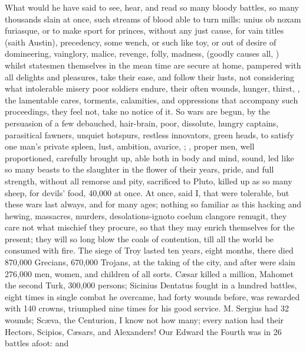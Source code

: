 {What would he have said to see, hear, and read so many bloody battles,
so many thousands slain at once, such streams of blood able to turn
mills: unius ob noxam furiasque, or to make sport for princes, without
any just cause, for vain titles (saith Austin), precedency, some
wench, or such like toy, or out of desire of domineering, vainglory,
malice, revenge, folly, madness, (goodly causes all, ) whilst statesmen themselves in the
mean time are secure at home, pampered with all delights and pleasures,
take their ease, and follow their lusts, not considering what
intolerable misery poor soldiers endure, their often wounds, hunger,
thirst, \etc{}, the lamentable cares, torments, calamities, and
oppressions that accompany such proceedings, they feel not, take no
notice of it. So wars are begun, by the persuasion of a few debauched,
hair-brain, poor, dissolute, hungry captains, parasitical fawners,
unquiet hotspurs, restless innovators, green heads, to satisfy one
man's private spleen, lust, ambition, avarice, \etc{}; , proper men, well
proportioned, carefully brought up, able both in body and mind, sound,
led like so many beasts to the slaughter in the flower of their
years, pride, and full strength, without all remorse and pity,
sacrificed to Pluto, killed up as so many sheep, for devils' food,
40,000 at once. At once, said I, that were tolerable, but these wars
last always, and for many ages; nothing so familiar as this hacking and
hewing, massacres, murders, desolations-ignoto coelum clangore remugit,
they care not what mischief they procure, so that they may enrich
themselves for the present; they will so long blow the coals of
contention, till all the world be consumed with fire. The siege of
Troy lasted ten years, eight months, there died 870,000 Grecians,
670,000 Trojans, at the taking of the city, and after were slain
276,000 men, women, and children of all sorts. C\ae{}sar killed a million,
Mahomet the second Turk, 300,000 persons; Sicinius Dentatus fought
in a hundred battles, eight times in single combat he overcame, had
forty wounds before, was rewarded with 140 crowns, triumphed nine times
for his good service. M. Sergius had 32 wounds; Sc\ae{}va, the Centurion,
I know not how many; every nation had their Hectors, Scipios, C\ae{}sars,
and Alexanders! Our Edward the Fourth was in 26 battles afoot: and
}
